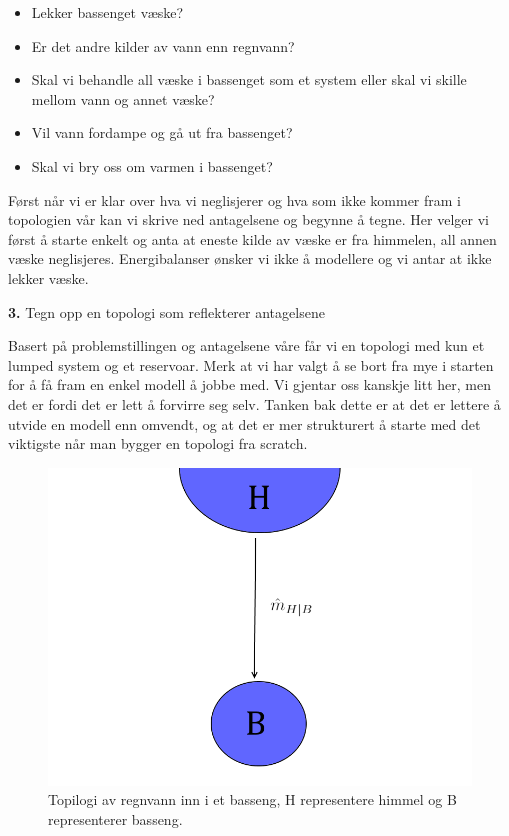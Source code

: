 \begin{itemize}
    \item Lekker bassenget væske?
    \item Er det andre kilder av vann enn regnvann?
    \item Skal vi behandle all væske i bassenget som et system eller skal vi skille mellom vann og annet væske?
    \item Vil vann fordampe og gå ut fra bassenget?
    \item Skal vi bry oss om varmen i bassenget?
\end{itemize}

Først når vi er klar over hva vi neglisjerer og hva som ikke kommer fram i topologien vår kan vi skrive ned antagelsene og begynne å tegne. Her velger vi først å starte enkelt og anta at eneste kilde av væske er fra himmelen, all annen væske neglisjeres. Energibalanser ønsker vi ikke å modellere og vi antar at ikke lekker væske. 

\begin{center}
\textbf{3.} Tegn opp en topologi som reflekterer antagelsene
\end{center}

Basert på problemstillingen og antagelsene våre får vi en topologi med kun et lumped system og et reservoar. Merk at vi har valgt å se bort fra mye i starten for å få fram en enkel modell å jobbe med. Vi gjentar oss kanskje litt her, men det er fordi det er lett å forvirre seg selv. Tanken bak dette er at det er lettere å utvide en modell enn omvendt, og at det er mer strukturert å starte med det viktigste når man bygger en topologi fra scratch. 
\begin{figure}[H]
    \centering
    \includegraphics[scale=0.3]{Figures/Basseng1.png}
    \caption{Topilogi av regnvann inn i et basseng, H representere himmel og B representerer basseng.}
    \label{fig:topologi_enkel1}
\end{figure}


